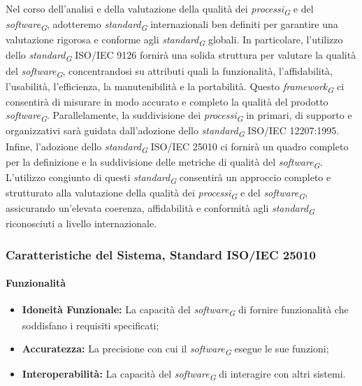 Nel corso dell'analisi e della valutazione della qualità dei \textit{processi}\textsubscript{\textit{G}} e del \textit{software}\textsubscript{\textit{G}}, adotteremo \textit{standard}\textsubscript{\textit{G}} internazionali ben definiti per garantire una valutazione rigorosa e conforme agli \textit{standard}\textsubscript{\textit{G}} globali. In particolare, l'utilizzo dello \textit{standard}\textsubscript{\textit{G}} ISO/IEC 9126 fornirà una solida struttura per valutare la qualità del \textit{software}\textsubscript{\textit{G}}, concentrandosi su attributi quali la funzionalità, l'affidabilità, l'usabilità, l'efficienza, la manutenibilità e la portabilità. Questo \textit{framework}\textsubscript{\textit{G}} ci consentirà di misurare in modo accurato e completo la qualità del prodotto \textit{software}\textsubscript{\textit{G}}. Parallelamente, la suddivisione dei \textit{processi}\textsubscript{\textit{G}} in primari, di supporto e organizzativi sarà guidata dall'adozione dello \textit{standard}\textsubscript{\textit{G}} ISO/IEC 12207:1995. Infine, l'adozione dello \textit{standard}\textsubscript{\textit{G}} ISO/IEC 25010 ci fornirà un quadro completo per la definizione e la suddivisione delle metriche di qualità del \textit{software}\textsubscript{\textit{G}}.
L'utilizzo congiunto di questi \textit{standard}\textsubscript{\textit{G}} consentirà un approccio completo e strutturato alla valutazione della qualità dei \textit{processi}\textsubscript{\textit{G}} e del \textit{software}\textsubscript{\textit{G}}, assicurando un'elevata coerenza, affidabilità e conformità agli \textit{standard}\textsubscript{\textit{G}} riconosciuti a livello internazionale.

\subsubsection{Caratteristiche del Sistema, Standard ISO/IEC 25010}

\paragraph{Funzionalità}
\begin{itemize}
    \item \textbf{Idoneità Funzionale:} La capacità del \textit{software}\textsubscript{\textit{G}} di fornire funzionalità che soddisfano i requisiti specificati;
    \item \textbf{Accuratezza:} La precisione con cui il \textit{software}\textsubscript{\textit{G}} esegue le sue funzioni;
    \item \textbf{Interoperabilità:} La capacità del \textit{software}\textsubscript{\textit{G}} di interagire con altri sistemi.
\end{itemize}

